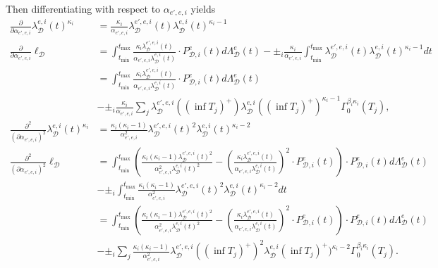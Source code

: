\documentclass[honours,12pt]{unswthesis}
\numberwithin{equation}{section}
\begin{document}
Then differentiating with respect to $\alpha_{e',e,i}$ yields
\begin{equation*}
	\begin{align}
		\frac{\partial}{\partial\alpha_{e',e,i}} \lambda_\mathcal{D}^{e,i}(t)^{\kappa_i} &= \frac{\kappa_i}{\alpha_{e',e,i}} \lambda_\mathcal{D}^{e',e,i}(t) \lambda_\mathcal{D}^{e,i}(t)^{\kappa_i-1} \\
		\frac{\partial}{\partial\alpha_{e',e,i}}\ell_\mathcal{D} &= \int_{t_\mathrm{min}}^{t_\mathrm{max}} \frac{\kappa_i \lambda_\mathcal{D}^{e',e,i}(t)}{\alpha_{e',e,i}\lambda_\mathcal{D}^{e,i}(t)} \cdot P_{\mathcal{D},i}^e(t) d\Lambda_\mathcal{D}^e(t) - \pm_i \frac{\kappa_i}{\alpha_{e',e,i}} \int_{t_\mathrm{min}}^{t_\mathrm{max}} \lambda_\mathcal{D}^{e',e,i}(t)\lambda_\mathcal{D}^{e,i}(t)^{\kappa_i-1}dt \\
		&= \int_{t_\mathrm{min}}^{t_\mathrm{max}} \frac{\kappa_i \lambda_\mathcal{D}^{e',e,i}(t)}{\alpha_{e',e,i}\lambda_\mathcal{D}^{e,i}(t)} \cdot P_{\mathcal{D},i}^e(t) d\Lambda_\mathcal{D}^e(t) \\
		&- \pm_i \frac{\kappa_i}{\alpha_{e',e,i}} \sum_j \lambda_\mathcal{D}^{e',e,i}((\inf T_j)^+)\lambda_\mathcal{D}^{e,i}((\inf T_j)^+)^{\kappa_i-1} \Gamma_0^{\beta_i\kappa_i}(T_j), \\
		\frac{\partial^2}{(\partial\alpha_{e',e,i})^2} \lambda_\mathcal{D}^{e,i}(t)^{\kappa_i} &= \frac{\kappa_i(\kappa_i-1)}{\alpha_{e',e,i}^2} \lambda_\mathcal{D}^{e',e,i}(t)^2 \lambda_\mathcal{D}^{e,i}(t)^{\kappa_i-2}  \\
		\frac{\partial^2}{(\partial\alpha_{e',e,i})^2}\ell_\mathcal{D} &= \int_{t_\mathrm{min}}^{t_\mathrm{max}} \left( \frac{\kappa_i(\kappa_i-1)\lambda_\mathcal{D}^{e',e,i}(t)^2}{\alpha_{e',e,i}^2\lambda_\mathcal{D}^{e,i}(t)^2} - \left(\frac{\kappa_i \lambda_\mathcal{D}^{e',e,i}(t)}{\alpha_{e',e,i}\lambda_\mathcal{D}^{e,i}(t)}\right)^2 \cdot P_{\mathcal{D},i}^e(t) \right) \cdot P_{\mathcal{D},i}^e(t) d\Lambda_\mathcal{D}^e(t) \\
		&- \pm_i \int_{t_\mathrm{min}}^{t_\mathrm{max}} \frac{\kappa_i(\kappa_i-1)}{\alpha_{e',e,i}^2} \lambda_\mathcal{D}^{e',e,i}(t)^2 \lambda_\mathcal{D}^{e,i}(t)^{\kappa_i-2} dt \\
		&= \int_{t_\mathrm{min}}^{t_\mathrm{max}} \left( \frac{\kappa_i(\kappa_i-1)\lambda_\mathcal{D}^{e',e,i}(t)^2}{\alpha_{e',e,i}^2\lambda_\mathcal{D}^{e,i}(t)^2} - \left(\frac{\kappa_i \lambda_\mathcal{D}^{e',e,i}(t)}{\alpha_{e',e,i}\lambda_\mathcal{D}^{e,i}(t)}\right)^2 \cdot P_{\mathcal{D},i}^e(t) \right) \cdot P_{\mathcal{D},i}^e(t) d\Lambda_\mathcal{D}^e(t) \\
		&- \pm_i \sum_j \frac{\kappa_i(\kappa_i-1)}{\alpha_{e',e,i}^2} \lambda_\mathcal{D}^{e',e,i}((\inf T_j)^+)^2 \lambda_\mathcal{D}^{e,i}(\inf T_j)^+)^{\kappa_i-2} \Gamma_0^{\beta_i\kappa_i}(T_j). \\
	\end{align}
\end{equation*}
\end{document}
